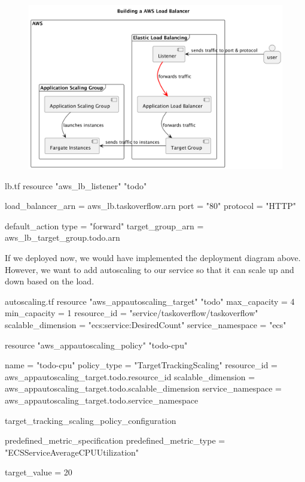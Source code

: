 \documentclass{csse4400}
\begin{document}
\begin{figure}[H]
  \begin{center}
    \includegraphics[scale=0.2]{diagrams/lb4fargate}
  \end{center}
\end{figure}

\begin{code}[language=terraform,numbers=none,keepspaces=true]{lb.tf}
resource "aws_lb_listener" "todo" {
  load_balancer_arn   = aws_lb.taskoverflow.arn
  port                = "80"
  protocol            = "HTTP"

  default_action {
    type              = "forward"
    target_group_arn  = aws_lb_target_group.todo.arn
  }
}
\end{code}

If we deployed now, we would have implemented the deployment diagram above.
However, we want to add autoscaling to our service so that it can scale up and down based on the load.

\begin{code}[language=terraform,numbers=none,keepspaces=true]{autoscaling.tf}
resource "aws_appautoscaling_target" "todo" {
  max_capacity        = 4
  min_capacity        = 1
  resource_id         = "service/taskoverflow/taskoverflow"
  scalable_dimension  = "ecs:service:DesiredCount"
  service_namespace   = "ecs"
}


resource "aws_appautoscaling_policy" "todo-cpu" {
  name                = "todo-cpu"
  policy_type         = "TargetTrackingScaling"
  resource_id         = aws_appautoscaling_target.todo.resource_id
  scalable_dimension  = aws_appautoscaling_target.todo.scalable_dimension
  service_namespace   = aws_appautoscaling_target.todo.service_namespace

  target_tracking_scaling_policy_configuration {
    predefined_metric_specification {
      predefined_metric_type  = "ECSServiceAverageCPUUtilization"
    }

    target_value              = 20
  }
}
\end{code}
\end{document}

